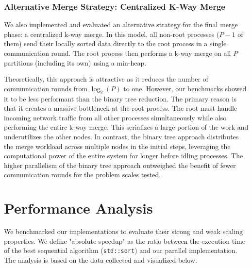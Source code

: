 \documentclass[10pt]{article}
\newcommand{\code}[1]{\texttt{#1}}
\begin{document}
\subsubsection{Alternative Merge Strategy: Centralized K-Way Merge}
We also implemented and evaluated an alternative strategy for the final merge phase: a centralized k-way merge. In this model, all non-root processes ($P-1$ of them) send their locally sorted data directly to the root process in a single communication round. The root process then performs a k-way merge on all $P$ partitions (including its own) using a min-heap.

Theoretically, this approach is attractive as it reduces the number of communication rounds from $\log_2(P)$ to one. However, our benchmarks showed it to be less performant than the binary tree reduction. The primary reason is that it creates a massive bottleneck at the root process. The root must handle incoming network traffic from all other processes simultaneously while also performing the entire k-way merge. This serializes a large portion of the work and underutilizes the other nodes. In contrast, the binary tree approach distributes the merge workload across multiple nodes in the initial steps, leveraging the computational power of the entire system for longer before idling processes. The higher parallelism of the binary tree approach outweighed the benefit of fewer communication rounds for the problem scales tested.

\section{Performance Analysis}
We benchmarked our implementations to evaluate their strong and weak scaling properties. We define "absolute speedup" as the ratio between the execution time of the best sequential algorithm (\code{std::sort}) and our parallel implementation. The analysis is based on the data collected and visualized below.
\end{document}
